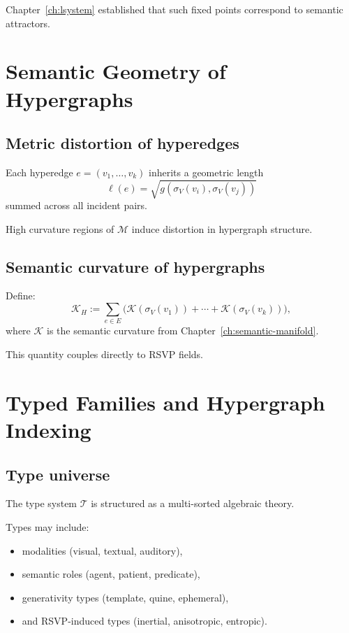 Chapter~\ref{ch:lsystem} established that such fixed points correspond to
semantic attractors.

\section{Semantic Geometry of Hypergraphs}

\subsection{Metric distortion of hyperedges}

Each hyperedge $e=(v_1,\dots,v_k)$ inherits a geometric length
\[
\ell(e) = \sqrt{g(\sigma_V(v_i),\sigma_V(v_j))}
\]
summed across all incident pairs.

High curvature regions of $\mathcal{M}$ induce distortion in hypergraph
structure.

\subsection{Semantic curvature of hypergraphs}

Define:
\[
\mathcal{K}_H :=
\sum_{e\in E}
\bigl(
\mathcal{K}(\sigma_V(v_1))
+ \cdots +
\mathcal{K}(\sigma_V(v_k))
\bigr),
\]
where $\mathcal{K}$ is the semantic curvature from
Chapter~\ref{ch:semantic-manifold}.

This quantity couples directly to RSVP fields.

\section{Typed Families and Hypergraph Indexing}

\subsection{Type universe}

The type system $\mathcal{T}$ is structured as a multi-sorted algebraic theory.

Types may include:
\begin{itemize}
  \item modalities (visual, textual, auditory),
  \item semantic roles (agent, patient, predicate),
  \item generativity types (template, quine, ephemeral),
  \item and RSVP-induced types (inertial, anisotropic, entropic).
\end{itemize}

